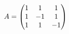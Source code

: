 \documentclass[preview]{standalone}
\begin{document}
\begin{align*}
\special{dvisvgm:raw <g id='unique000'>}A=\begin{pmatrix}1&1&1\\1&-1&1\\1&1&-1\end{pmatrix}\special{dvisvgm:raw </g>}
\end{align*}
\end{document}
